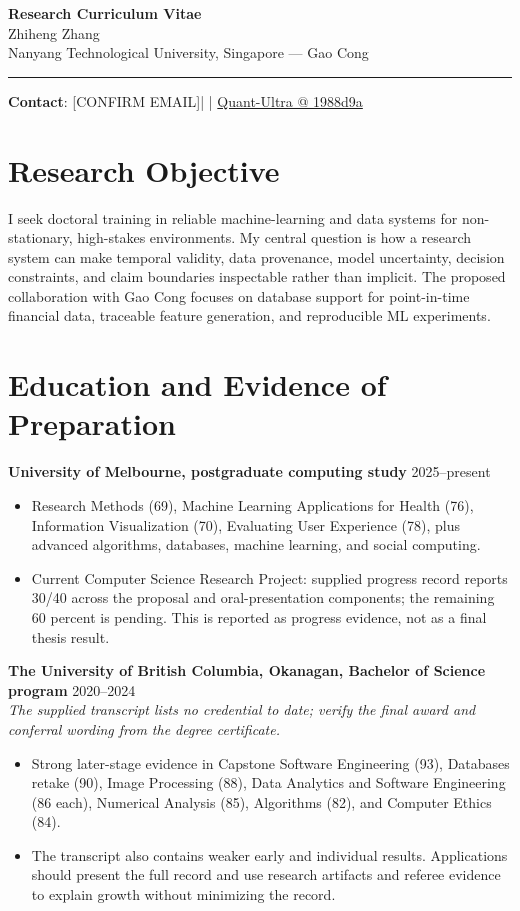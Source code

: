 \documentclass[11pt]{article}
\makeatletter
\newcommand{\ApplicantName}{Zhiheng Zhang}
\newcommand{\ApplicantEmail}{[CONFIRM EMAIL]}
\newcommand{\ApplicantPhone}{[CONFIRM PHONE]}
\newcommand{\ApplicantGitHub}{\href{https://github.com/zhiheng-zhang-Mera/Quant-Ultra/tree/1988d9a8530da91a8158de864d098ea869098923}{Quant-Ultra @ 1988d9a}}
\makeatother
\begin{document}
\begin{center}
{\LARGE\bfseries Research Curriculum Vitae}\\[0.25em]
{\large \ApplicantName}\\
Nanyang Technological University, Singapore --- Gao Cong
\end{center}
\vspace{0.35em}\hrule\vspace{0.65em}

\textbf{Contact}: \ApplicantEmail\quad | \quad \ApplicantPhone\quad | \quad \ApplicantGitHub

\section*{Research Objective}
I seek doctoral training in reliable machine-learning and data systems for non-stationary, high-stakes environments. My central question is how a research system can make temporal validity, data provenance, model uncertainty, decision constraints, and claim boundaries inspectable rather than implicit. The proposed collaboration with Gao Cong focuses on database support for point-in-time financial data, traceable feature generation, and reproducible ML experiments.

\section*{Education and Evidence of Preparation}
\textbf{University of Melbourne, postgraduate computing study} \hfill 2025--present
\begin{itemize}
\item Research Methods (69), Machine Learning Applications for Health (76), Information Visualization (70), Evaluating User Experience (78), plus advanced algorithms, databases, machine learning, and social computing.
\item Current Computer Science Research Project: supplied progress record reports 30/40 across the proposal and oral-presentation components; the remaining 60 percent is pending. This is reported as progress evidence, not as a final thesis result.
\end{itemize}

\textbf{The University of British Columbia, Okanagan, Bachelor of Science program} \hfill 2020--2024\\
\textit{The supplied transcript lists no credential to date; verify the final award and conferral wording from the degree certificate.}
\begin{itemize}
\item Strong later-stage evidence in Capstone Software Engineering (93), Databases retake (90), Image Processing (88), Data Analytics and Software Engineering (86 each), Numerical Analysis (85), Algorithms (82), and Computer Ethics (84).
\item The transcript also contains weaker early and individual results. Applications should present the full record and use research artifacts and referee evidence to explain growth without minimizing the record.
\end{itemize}
\end{document}
